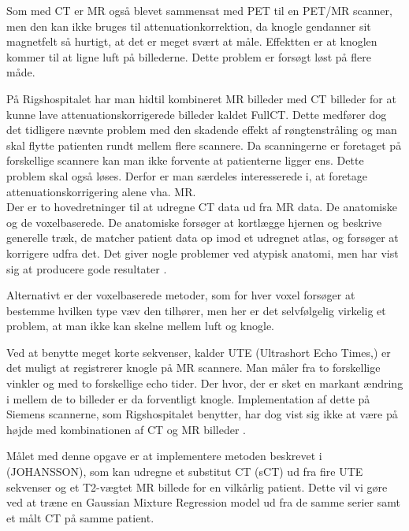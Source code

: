 Som med CT er MR også blevet sammensat med PET til en PET/MR scanner, men den kan ikke bruges til attenuationkorrektion, da knogle gendanner sit magnetfelt så hurtigt, at det er meget svært at måle. Effektten er at knoglen kommer til at ligne luft på billederne. Dette problem er forsøgt løst på flere måde.

På Rigshospitalet har man hidtil kombineret MR billeder med CT billeder
for at kunne lave attenuationskorrigerede billeder kaldet FullCT. Dette medfører dog det tidligere nævnte problem med den skadende effekt af røngtenstråling og man skal flytte patienten rundt mellem flere scannere. Da scanningerne er foretaget på forskellige scannere kan man ikke forvente at patienterne ligger ens. Dette problem skal også løses. Derfor er man særdeles interesserede i, at foretage attenuationskorrigering alene vha. MR. \\

Der er to hovedretninger til at udregne CT data ud fra MR data. De anatomiske og de voxelbaserede. De anatomiske forsøger at kortlægge hjernen og beskrive generelle træk, de matcher patient data op imod et udregnet atlas, og forsøger at korrigere udfra det. Det giver nogle problemer ved atypisk anatomi, men har vist sig at producere gode resultater .

Alternativt er der voxelbaserede metoder, som for hver voxel forsøger at bestemme hvilken type væv den tilhører, men her er det selvfølgelig virkelig et problem, at man ikke kan skelne mellem luft og knogle.

Ved at benytte meget korte sekvenser, kalder UTE (Ultrashort Echo Times,) er det muligt at registrerer knogle på MR scannere. Man måler fra to forskellige vinkler og med to forskellige echo tider. Der hvor, der er sket en markant ændring i mellem de to billeder er da forventligt knogle. Implementation af dette på Siemens scannerne, som Rigshospitalet benytter, har dog vist sig ikke at være på højde med kombinationen af CT og MR billeder .

Målet med denne opgave er at implementere metoden beskrevet i (JOHANSSON), som kan udregne et substitut CT (sCT) ud fra fire UTE sekvenser og et T2-vægtet MR billede for en vilkårlig patient. Dette vil vi gøre ved at træne en Gaussian Mixture Regression model ud fra de samme serier samt et målt CT på samme patient. 
